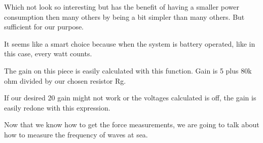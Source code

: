 Which not look so interesting but has the benefit of having a smaller power consumption then many others by being a bit simpler than many others. But sufficient for our purpose.


It seems like a smart choice because when the system is battery operated, like in this case, every watt counts.


The gain on this piece is easily calculated with this function. Gain is 5 plus 80k ohm divided by our chosen resistor Rg.


If our desired 20 gain might not work or the voltages calculated is off, the gain is easily redone with this expression.


Now that we know how to get the force measurements, we are going to talk about how to measure the frequency of waves at sea.




